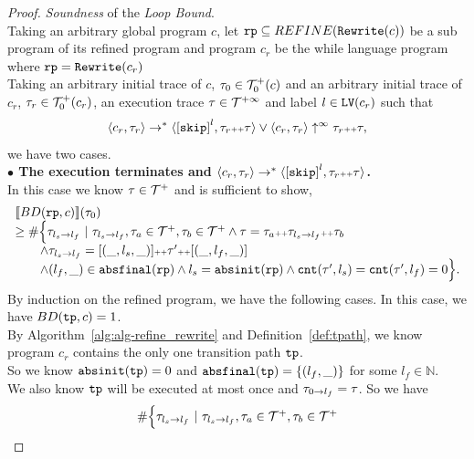 \begin{proof}
\emph{Soundness} of the \emph{Loop Bound}.
  \\
  Taking an arbitrary global program $c$, let $\mathtt{rp} \subseteq REFINE(\mathtt{Rewrite}(c))$ be a sub program of its refined program and program $c_r$ be the while language program where $\mathtt{rp} = \mathtt{Rewrite}(c_r)$
  \\
Taking an arbitrary initial trace of $c$, $\mathtt{\tau}_0 \in \mathcal{T}^{+}_0(c)$ and an arbitrary initial trace of $c_r$, $\mathtt{\tau}_r \in \mathcal{T}^{+}_0(c_r)$, 
 an execution trace $\mathtt{\tau} \in \mathcal{T}^{+\infty}$ and label $l \in \mathtt{LV}(c_r)$
 such that 
 \[
  \config{{c_r}, \trace_r} \to^{*} \config{\clabel{\eskip}^{l}, \trace_r \tracecat \trace} \lor \config{c_r, \trace_r} \uparrow^{\infty} \trace_r \tracecat \trace,
  \]
 we have two cases.
\\
\textbf{$\bullet$ The execution terminates and {$\config{{c_r}, \trace_r} \to^{*} \config{\clabel{\eskip}^{l}, \trace_r \tracecat \trace}$}.} 
\\
 In this case we know $\mathtt{\tau} \in \mathcal{T}^{+}$ and is sufficient to show,
 \[
  \begin{array}{l}
  \llbracket BD(\mathtt{rp}, c) \rrbracket(\mathtt{\tau}_0) 
  \\ \geq
  \# \Big\{\mathtt{\tau}_{l_s \to l_f} ~\vert~ \mathtt{\tau}_{l_s \to l_f}, \mathtt{\tau}_a \in \mathcal{T}^{+}, \mathtt{\tau}_b \in \mathcal{T}^{+}
  \land \mathtt{\tau} = \mathtt{\tau}_a {\scriptscriptstyle ++} \mathtt{\tau}_{l_s \to l_f} {\scriptscriptstyle ++} \mathtt{\tau}_b
  \\ \qquad
  \land \mathtt{\tau}_{l_s \to l_f} = [(\_, l_s, \_)] {\scriptscriptstyle ++} \mathtt{\tau}' {\scriptscriptstyle ++} [(\_, l_f, \_)]
  \\ \qquad
  \land (l_{f}, \_) \in \mathtt{abs}{\mathtt{final}}(\mathtt{rp})
  \land l_s = \mathtt{abs}{\mathtt{init}}(\mathtt{rp})
  \land \mathtt{cnt}(\mathtt{\tau}', l_s) = \mathtt{cnt}(\mathtt{\tau}', l_f) = 0 
  \Big\}.
\end{array}
\]
By induction on the refined program, we have the following cases.
\caseL{$\rprog = \tpath$}
In this case, we have $BD(\mathtt{tp}, c) = 1$.
\\
By Algorithm~\ref{alg:alg-refine_rewrite} and Definition~\ref{def:tpath}, we know program $c_r$ contains the only one transition path $\mathtt{tp}$.
\\
So we know $\mathtt{abs}{\mathtt{init}}(\mathtt{tp}) = 0$ and $\mathtt{abs}{\mathtt{final}}(\mathtt{tp}) = \{ (l_f, \_) \}$ for some $l_f \in \mathbb{N}$.
\\
We also know $\mathtt{tp}$ will be executed at most once and $\mathtt{\tau}_{0 \to l_f} = \mathtt{\tau}$. So we have
\[
  \begin{array}{l}
    \# \Big\{\mathtt{\tau}_{l_s \to l_f} ~\vert~ \mathtt{\tau}_{l_s \to l_f}, \mathtt{\tau}_a \in \mathcal{T}^{+}, \mathtt{\tau}_b \in \mathcal{T}^{+}

\end{array}\]
\end{proof}

